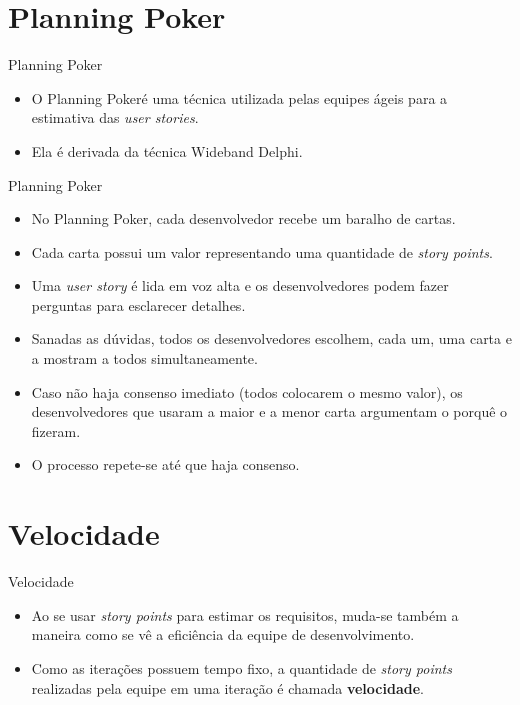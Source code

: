 \documentclass[11pt]{beamer}
\begin{document}
    \section{Planning Poker\texttrademark}

    \begin{frame}{Planning Poker\texttrademark}
        \begin{itemize}
            \item O Planning Poker\texttrademark é uma técnica utilizada pelas equipes ágeis para a estimativa das \textit{user stories}.
            \item Ela é derivada da técnica Wideband Delphi.
        \end{itemize}
    \end{frame}

    \begin{frame}{Planning Poker\texttrademark}
        \begin{itemize}
            \item No Planning Poker\texttrademark, cada desenvolvedor recebe um baralho de cartas.
            \item Cada carta possui um valor representando uma quantidade de \textit{story points}.
            \item Uma \textit{user story} é lida em voz alta e os desenvolvedores podem fazer perguntas para esclarecer detalhes.
            \item Sanadas as dúvidas, todos os desenvolvedores escolhem, cada um, uma carta e a mostram a todos simultaneamente.
            \item Caso não haja consenso imediato (todos colocarem o mesmo valor), os desenvolvedores que usaram a maior e a menor carta argumentam o porquê o fizeram.
            \item O processo repete-se até que haja consenso. 
        \end{itemize}
    \end{frame}

    \section{Velocidade}

    \begin{frame}{Velocidade}
        \begin{itemize}
            \item Ao se usar \textit{story points} para estimar os requisitos, muda-se também a maneira como se vê a eficiência da equipe de desenvolvimento.
            \item Como as iterações possuem tempo fixo, a quantidade de \textit{story points} realizadas pela equipe em uma iteração é chamada \textbf{velocidade}.
        \end{itemize}
    \end{frame}
\end{document}
